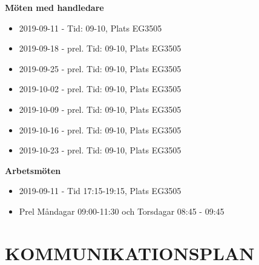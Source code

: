\documentclass[a4paper]{article}
\begin{document}
\textbf{Möten med handledare}
\begin{itemize}
	\item 2019-09-11 - Tid: 09-10, Plats EG3505
	\item 2019-09-18 - prel. Tid: 09-10, Plats EG3505
	\item 2019-09-25 - prel. Tid: 09-10, Plats EG3505
	\item 2019-10-02 - prel. Tid: 09-10, Plats EG3505
	\item 2019-10-09 - prel. Tid: 09-10, Plats EG3505
	\item 2019-10-16 - prel. Tid: 09-10, Plats EG3505
	\item 2019-10-23 - prel. Tid: 09-10, Plats EG3505

\end{itemize}
\noindent
\textbf{Arbetsmöten}
\begin{itemize}
	\item 2019-09-11 - Tid 17:15-19:15, Plats EG3505
	\item Prel Måndagar 09:00-11:30 och Torsdagar 08:45 - 09:45


\end{itemize}

\section{KOMMUNIKATIONSPLAN}
\label{sec:komm}
\end{document}
